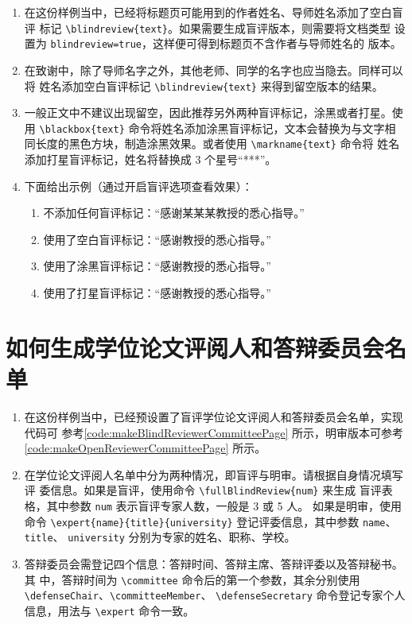 \documentclass[lang=chs, degree=phd, blindreview=false, winfonts=true]{nputhesis}
\begin{document}
\begin{enumerate}
    \setlength{\itemsep}{0pt}
    \item 在这份样例当中，已经将标题页可能用到的作者姓名、导师姓名添加了空白盲评
          标记 \lstinline`\blindreview{text}`。如果需要生成盲评版本，则需要将文档类型
          设置为 \lstinline`blindreview=true`，这样便可得到标题页不含作者与导师姓名的
          版本。
    \item 在致谢中，除了导师名字之外，其他老师、同学的名字也应当隐去。同样可以将
          姓名添加空白盲评标记 \lstinline`\blindreview{text}` 来得到留空版本的结果。
    \item 一般正文中不建议出现留空，因此推荐另外两种盲评标记，涂黑或者打星。使用
          \lstinline`\blackbox{text}` 命令将姓名添加涂黑盲评标记，文本会替换为与文字相
          同长度的黑色方块，制造涂黑效果。或者使用 \lstinline`\markname{text}` 命令将
          姓名添加打星盲评标记，姓名将替换成 3 个星号“***”。
    \item 下面给出示例（通过开启盲评选项查看效果）：
          \begin{enumerate}
              \setlength{\itemsep}{0pt}
              \item 不添加任何盲评标记：“感谢某某某教授的悉心指导。”
              \item 使用了空白盲评标记：“感谢教授的悉心指导。”
              \item 使用了涂黑盲评标记：“感谢教授的悉心指导。”
              \item 使用了打星盲评标记：“感谢教授的悉心指导。”
          \end{enumerate}
\end{enumerate}

\section{如何生成学位论文评阅人和答辩委员会名单}

\begin{enumerate}
    \setlength{\itemsep}{0pt}
    \item 在这份样例当中，已经预设置了盲评学位论文评阅人和答辩委员会名单，实现代码可
          参考\autoref{code:makeBlindReviewerCommitteePage} 所示，明审版本可参考
          \autoref{code:makeOpenReviewerCommitteePage} 所示。
    \item 在学位论文评阅人名单中分为两种情况，即盲评与明审。请根据自身情况填写评
          委信息。如果是盲评，使用命令 \lstinline`\fullBlindReview{num}` 来生成
          盲评表格，其中参数 \lstinline`num` 表示盲评专家人数，一般是 3 或 5 人。
          如果是明审，使用命令 \lstinline`\expert{name}{title}{university}`
          登记评委信息，其中参数 \lstinline`name`、\lstinline`title`、
          \lstinline`university` 分别为专家的姓名、职称、学校。
    \item 答辩委员会需登记四个信息：答辩时间、答辩主席、答辩评委以及答辩秘书。其
          中，答辩时间为 \lstinline`\committee` 命令后的第一个参数，其余分别使用
          \lstinline`\defenseChair`、\lstinline`\committeeMember`、
          \lstinline`\defenseSecretary` 命令登记专家个人信息，用法与
          \lstinline`\expert` 命令一致。
\end{enumerate}
\end{document}
